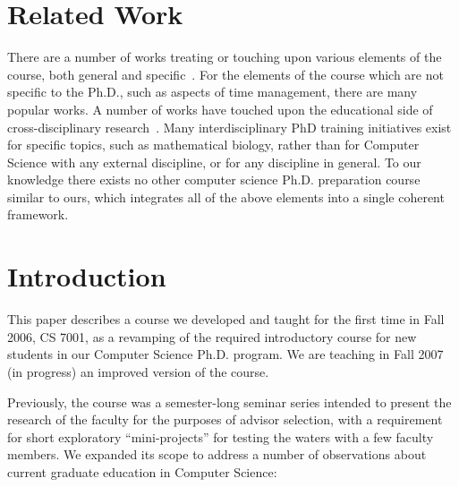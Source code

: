 \section{Related Work}\label{sec:related}

There are a number of works treating or touching upon various elements
of the course, both general and
specific~\cite{phd-not-enough,reshaping-grad-educ,grad-school-survival,
  unwritten-rules,art-sci-investigation,creativity-in-science,res-students-guide}.
For the elements of the course which are not specific to the Ph.D., such
as aspects of time management, there are many popular works.  A number
of works have touched upon the educational side of cross-disciplinary
research~\cite{work-at-boundaries,facilitating-interdisc,
  grand-unif-interdisc,discourse-anal-cross-disc}.  Many
interdisciplinary PhD training initiatives exist for specific topics,
such as mathematical biology, rather than for Computer Science with any
external discipline, or for any discipline in general.  To our knowledge
there exists no other computer science Ph.D. preparation course similar
to ours, which integrates all of the above elements into a single
coherent framework.

\section{Introduction}

This paper describes a course we developed and taught for the first
time in Fall 2006, CS 7001, as a revamping of the required
introductory course for new students in our Computer Science Ph.D.
program.  We are teaching in Fall 2007 (in progress)
an improved version of the course.

Previously, the course was a semester-long seminar series
intended to present the research of the faculty for
the purposes of advisor selection, with a requirement for short
exploratory ``mini-projects'' for testing the waters with a few faculty
members.  We expanded its scope to
address a number of observations about current graduate education in
Computer Science:

